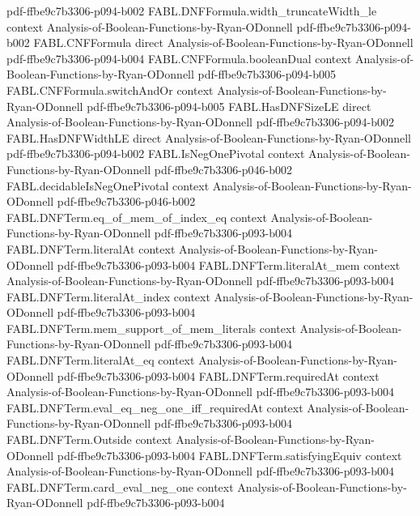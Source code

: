 \begin{theorem}
  {pdf-ffbe9c7b3306-p094-b002}
\proofstep
  {FABL.DNFFormula.width_truncateWidth_le}
  {context}
  {Analysis-of-Boolean-Functions-by-Ryan-ODonnell}
  {pdf-ffbe9c7b3306-p094-b002}
\proofstep
  {FABL.CNFFormula}
  {direct}
  {Analysis-of-Boolean-Functions-by-Ryan-ODonnell}
  {pdf-ffbe9c7b3306-p094-b004}
\proofstep
  {FABL.CNFFormula.booleanDual}
  {context}
  {Analysis-of-Boolean-Functions-by-Ryan-ODonnell}
  {pdf-ffbe9c7b3306-p094-b005}
\proofstep
  {FABL.CNFFormula.switchAndOr}
  {context}
  {Analysis-of-Boolean-Functions-by-Ryan-ODonnell}
  {pdf-ffbe9c7b3306-p094-b005}
\proofstep
  {FABL.HasDNFSizeLE}
  {direct}
  {Analysis-of-Boolean-Functions-by-Ryan-ODonnell}
  {pdf-ffbe9c7b3306-p094-b002}
\proofstep
  {FABL.HasDNFWidthLE}
  {direct}
  {Analysis-of-Boolean-Functions-by-Ryan-ODonnell}
  {pdf-ffbe9c7b3306-p094-b002}
\proofstep
  {FABL.IsNegOnePivotal}
  {context}
  {Analysis-of-Boolean-Functions-by-Ryan-ODonnell}
  {pdf-ffbe9c7b3306-p046-b002}
\proofstep
  {FABL.decidableIsNegOnePivotal}
  {context}
  {Analysis-of-Boolean-Functions-by-Ryan-ODonnell}
  {pdf-ffbe9c7b3306-p046-b002}
\proofstep
  {FABL.DNFTerm.eq_of_mem_of_index_eq}
  {context}
  {Analysis-of-Boolean-Functions-by-Ryan-ODonnell}
  {pdf-ffbe9c7b3306-p093-b004}
\proofstep
  {FABL.DNFTerm.literalAt}
  {context}
  {Analysis-of-Boolean-Functions-by-Ryan-ODonnell}
  {pdf-ffbe9c7b3306-p093-b004}
\proofstep
  {FABL.DNFTerm.literalAt_mem}
  {context}
  {Analysis-of-Boolean-Functions-by-Ryan-ODonnell}
  {pdf-ffbe9c7b3306-p093-b004}
\proofstep
  {FABL.DNFTerm.literalAt_index}
  {context}
  {Analysis-of-Boolean-Functions-by-Ryan-ODonnell}
  {pdf-ffbe9c7b3306-p093-b004}
\proofstep
  {FABL.DNFTerm.mem_support_of_mem_literals}
  {context}
  {Analysis-of-Boolean-Functions-by-Ryan-ODonnell}
  {pdf-ffbe9c7b3306-p093-b004}
\proofstep
  {FABL.DNFTerm.literalAt_eq}
  {context}
  {Analysis-of-Boolean-Functions-by-Ryan-ODonnell}
  {pdf-ffbe9c7b3306-p093-b004}
\proofstep
  {FABL.DNFTerm.requiredAt}
  {context}
  {Analysis-of-Boolean-Functions-by-Ryan-ODonnell}
  {pdf-ffbe9c7b3306-p093-b004}
\proofstep
  {FABL.DNFTerm.eval_eq_neg_one_iff_requiredAt}
  {context}
  {Analysis-of-Boolean-Functions-by-Ryan-ODonnell}
  {pdf-ffbe9c7b3306-p093-b004}
\proofstep
  {FABL.DNFTerm.Outside}
  {context}
  {Analysis-of-Boolean-Functions-by-Ryan-ODonnell}
  {pdf-ffbe9c7b3306-p093-b004}
\proofstep
  {FABL.DNFTerm.satisfyingEquiv}
  {context}
  {Analysis-of-Boolean-Functions-by-Ryan-ODonnell}
  {pdf-ffbe9c7b3306-p093-b004}
\proofstep
  {FABL.DNFTerm.card_eval_neg_one}
  {context}
  {Analysis-of-Boolean-Functions-by-Ryan-ODonnell}
  {pdf-ffbe9c7b3306-p093-b004}

\end{theorem}
